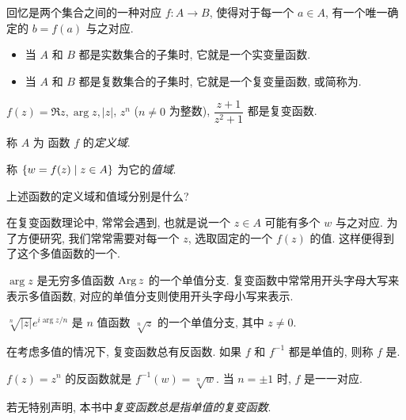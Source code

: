 回忆是两个集合之间的一种对应 $f:A\to B$, 使得对于每一个 $a\in A$, 有一个唯一确定的 $b=f(a)$ 与之对应.
\begin{itemize}
  \item 当 $A$ 和 $B$ 都是实数集合的子集时, 它就是一个实变量函数.
  \item 当 $A$ 和 $B$ 都是复数集合的子集时, 它就是一个复变量函数, 或简称为.
\end{itemize}

\begin{example}
  $f(z)=\Re z,\arg z,|z|$, $z^n$ ($n\neq0$ 为整数), $\dfrac{z+1}{z^2+1}$ 都是复变函数.
\end{example}

\begin{definition}
  \begin{enumpar}
    \item 称 $A$ 为 函数 $f$ 的\emph{定义域}.
    \item 称 ${\left\{w=f(z)\mid z\in A\right\}}$ 为它的\emph{值域}.\footnotemark
  \end{enumpar} 
\end{definition}
\begin{exercise}
  上述函数的定义域和值域分别是什么?
\end{exercise}

在复变函数理论中, 常常会遇到, 也就是说一个 $z\in A$ 可能有多个 $w$ 与之对应.
为了方便研究, 我们常常需要对每一个 $z$, 选取固定的一个 $f(z)$ 的值.
这样便得到了这个多值函数的一个.
\begin{example}\delspace
  \begin{enumnopar}[(i)]
    \item $\arg z$ 是无穷多值函数 $\operatorname{Arg} z$ 的一个单值分支.
    复变函数中常常用开头字母大写来表示多值函数, 对应的单值分支则使用开头字母小写来表示.
    \item $\sqrt[n]{|z|}e^{i\arg z/n}$ 是 $n$ 值函数 $\sqrt[n]z$ 的一个单值分支, 其中 $z\neq 0$.
  \end{enumnopar}
\end{example}

在考虑多值的情况下, 复变函数总有反函数.
如果 $f$ 和 $f^{-1}$ 都是单值的, 则称 $f$ 是.
\begin{example}
  $f(z)=z^n$ 的反函数就是 $f^{-1}(w)=\sqrt[n]{w}$.
  {当 $n=\pm1$ 时, $f$ 是一一对应.}
\end{example}
若无特别声明, 本书中\emph{复变函数总是指单值的复变函数}.


